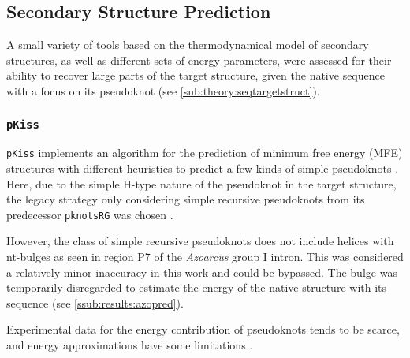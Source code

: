 \documentclass[../../master.tex]{subfiles}
\begin{document}
\subsection{Secondary Structure Prediction}
\label{sub:methods:sspred}



A small variety of tools based on the thermodynamical model of secondary structures, as well as different sets of energy parameters, were assessed for their ability to recover large parts of the target structure, given the native sequence with a focus on its pseudoknot (see \autoref{sub:theory:seqtargetstruct}).

\subsubsection{\texttt{pKiss}}
\label{ssub:methods:pkiss}

\texttt{pKiss} implements an algorithm for the prediction of minimum free energy (MFE) structures with different heuristics to predict a few kinds of simple pseudoknots \parencite{janssen_rna_2015}.
Here, due to the simple H-type nature of the pseudoknot in the target structure, the legacy strategy only considering simple recursive pseudoknots from its predecessor \texttt{pknotsRG} was chosen \parencite{reeder_design_2004, reeder_pknotsrg_2007}.

However, the class of simple recursive pseudoknots does not include helices with \unit[1]{nt}-bulges as seen in region P7 of the \textit{Azoarcus} group I intron.
This was considered a relatively minor inaccuracy in this work and could be bypassed.
The bulge was temporarily disregarded to estimate the energy of the native structure with its sequence (see \autoref{ssub:results:azopred}).

Experimental data for the energy contribution of pseudoknots tends to be scarce, and energy approximations have some limitations \parencite{gultyaev_approximation_1999, fallmann_recent_2017}.
\end{document}
